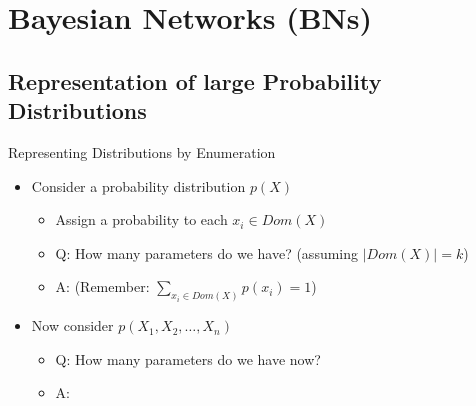 \section{Bayesian Networks (BNs)}

\subsection{Representation of large Probability Distributions}

\begin{frame}{Representing Distributions by Enumeration}{}
	\begin{itemize}
		\item Consider a probability distribution $p(X)$
		\begin{itemize}
			\item Assign a probability to each $x_i \in Dom(X)$
			\item Q: How many parameters do we have? (assuming $\vert Dom(X) \vert = k$)
			\item A:  (Remember: $\sum_{x_i \in Dom(X)} p(x_i) = 1$)
		\end{itemize}
		\item Now consider $p(X_1, X_2, \dots, X_n)$
		\begin{itemize}
			\item Q: How many parameters do we have now?
			\item A:  
		\end{itemize}
	\end{itemize}

	\begin{boxBlueNoFrame}
	\end{boxBlueNoFrame}
\end{frame}


